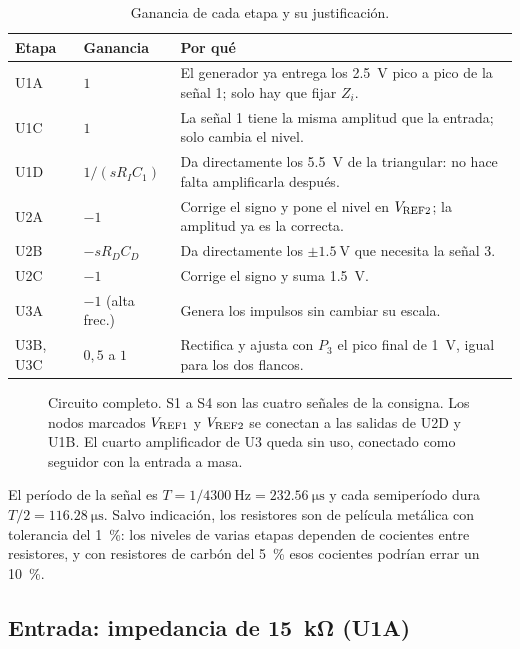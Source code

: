 \begin{table}[!htb]
\centering
\caption{Ganancia de cada etapa y su justificación.}
\label{tab:ganancias}
\footnotesize
\setlength{\tabcolsep}{3pt}
\begin{tabular}{@{}l>{\centering}p{1.3cm}>{\raggedright\arraybackslash}p{4.6cm}@{}}
\toprule
\textbf{Etapa} & \textbf{Ganancia} & \textbf{Por qué} \\
\midrule
U1A & $1$ & El generador ya entrega los \SI{2,5}{\volt} pico a pico de la señal 1; solo hay que fijar $Z_i$. \\
U1C & $1$ & La señal 1 tiene la misma amplitud que la entrada; solo cambia el nivel. \\
U1D & $1/(sR_IC_1)$ & Da directamente los \SI{5,5}{\volt} de la triangular: no hace falta amplificarla después. \\
U2A & $-1$ & Corrige el signo y pone el nivel en $V_{\mathrm{REF2}}$; la amplitud ya es la correcta. \\
U2B & $-sR_DC_D$ & Da directamente los $\pm\SI{1,5}{\volt}$ que necesita la señal 3. \\
U2C & $-1$ & Corrige el signo y suma \SI{1,5}{\volt}. \\
U3A & $-1$ (alta frec.) & Genera los impulsos sin cambiar su escala. \\
U3B, U3C & $0{,}5$ a $1$ & Rectifica y ajusta con $P_3$ el pico final de \SI{1}{\volt}, igual para los dos flancos. \\
\bottomrule
\end{tabular}
\end{table}

\begin{figure}[!t]
\centering

\caption{Circuito completo. S1 a S4 son las cuatro señales de la consigna. Los nodos marcados $V_{\mathrm{REF1}}$ y $V_{\mathrm{REF2}}$ se conectan a las salidas de U2D y U1B. El cuarto amplificador de U3 queda sin uso, conectado como seguidor con la entrada a masa.}
\label{fig:circuito}
\end{figure}

El período de la señal es $T = 1/\SI{4300}{\hertz} = \SI{232,56}{\micro\second}$ y cada semiperíodo dura $T/2 = \SI{116,28}{\micro\second}$. Salvo indicación, los resistores son de película metálica con tolerancia del \SI{1}{\percent}: los niveles de varias etapas dependen de cocientes entre resistores, y con resistores de carbón del \SI{5}{\percent} esos cocientes podrían errar un \SI{10}{\percent}.

\subsection{Entrada: impedancia de \SI{15}{\kilo\ohm} (U1A)}
\label{sec:entrada}
